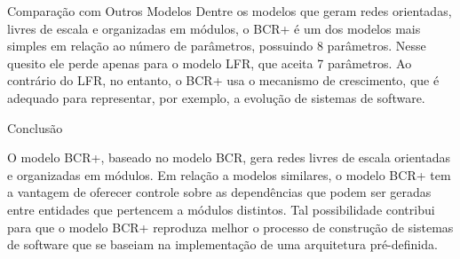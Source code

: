 \begin{section}{Comparação com Outros Modelos}
	Dentre os modelos que geram redes orientadas, livres de escala e organizadas em módulos, o BCR+ é um dos modelos mais simples em relação ao número de parâmetros, possuindo 8 parâmetros. Nesse quesito ele perde apenas para o modelo LFR, que aceita 7 parâmetros. Ao contrário do LFR, no entanto, o BCR+ usa o mecanismo de crescimento, que é adequado para representar, por exemplo, a evolução de sistemas de software.


	
\end{section}

\begin{section}{Conclusão}
	
	O modelo BCR+, baseado no modelo BCR, gera redes livres de escala orientadas e organizadas em módulos. Em relação a modelos similares, o modelo BCR+ tem a vantagem de oferecer controle sobre as dependências que podem ser geradas entre entidades que pertencem a módulos distintos. Tal possibilidade contribui para que o modelo BCR+ reproduza melhor o processo de construção de sistemas de software que se baseiam na implementação de uma arquitetura pré-definida.
	
\end{section}